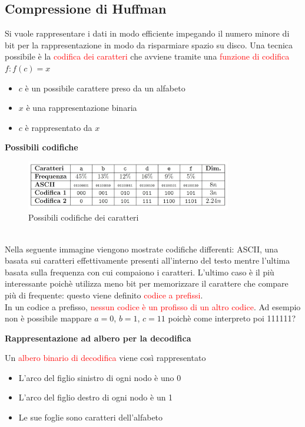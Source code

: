 \documentclass[../cheatSheetAlgoritmi.tex]{subfiles}
\begin{document}
\subsection{Compressione di Huffman}
Si vuole rappresentare i dati in modo efficiente impegando il numero minore di bit per la rappresentazione in modo da risparmiare spazio su disco. Una tecnica possibile è la \textcolor{red}{codifica dei caratteri} che avviene tramite una \textcolor{red}{funzione di codifica} $f : f(c) = x$
\begin{itemize}
	\item $c$ è un possibile carattere preso da un alfabeto
	\item $x$ è una rappresentazione binaria
	\item $c$ è rappresentato da $x$
\end{itemize}
\textbf{Possibili codifiche}
\begin{figure}[h]
\centering
\includegraphics[width=0.8\textwidth]{../img/Greedy_1.jpg}
\caption{Possibili codifiche dei caratteri}
\end{figure} \\
Nella seguente immagine viengono mostrate codifiche differenti: ASCII, una basata sui caratteri effettivamente presenti all'interno del testo mentre l'ultima basata sulla frequenza con cui compaiono i caratteri. L'ultimo caso è il più interessante poichè utilizza meno bit per memorizzare il carattere che compare più di frequente: questo viene definito \textcolor{red}{codice a prefissi}.\\
In un codice a prefisso, \textcolor{red}{nessun codice è un profisso di un altro codice}. Ad esempio non è possibile mappare $a = 0$, $b = 1$, $c = 11$ poichè come interpreto poi 111111?
\newpage
\begin{flushleft}
\textbf{Rappresentazione ad albero per la decodifica}
\end{flushleft}
Un \textcolor{red}{albero binario di decodifica} viene così rappresentato
\begin{itemize}
	\item L'arco del figlio sinistro di ogni nodo è uno 0
	\item L'arco del figlio destro di ogni nodo è un 1
	\item Le sue foglie sono caratteri dell'alfabeto
\end{itemize}
\end{document}
